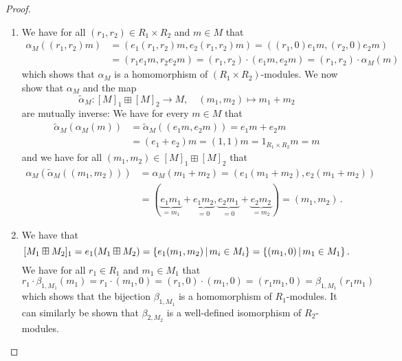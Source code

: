 \begin{proof}
  \leavevmode
  \begin{enumerate}
    \item
      We have for all $(r_1, r_2) \in R_1 \times R_2$ and $m \in M$ that
      \begin{align*}
            \alpha_M((r_1, r_2) m)
        &=  ( e_1 (r_1, r_2) m, e_2 (r_1, r_2) m )
         =  ( (r_1, 0) e_1 m, (r_2, 0) e_2 m )  \\
        &=  ( r_1 e_1 m , r_2 e_2 m )
         =  (r_1, r_2) \cdot (e_1 m, e_2 m)
         =  (r_1, r_2) \cdot \alpha_M(m)
      \end{align*}
      which shows that $\alpha_M$ is a homomorphism of $(R_1 \times R_2)$-modules.
      We now show that $\alpha_M$ and the map
      \[
                \tilde{\alpha}_M
        \colon  [M]_1 \boxplus [M]_2
        \to     M,
        \quad   (m_1, m_2)
        \mapsto m_1 + m_2
      \]
      are mutually inverse:
      We have for every $m \in M$ that
      \begin{align*}
            \tilde{\alpha}_M( \alpha_M(m) )
        &=  \tilde{\alpha}_M( (e_1 m, e_2 m) )
         =  e_1 m + e_2 m \\
        &=  (e_1 + e_2) m
         =  (1,1) m
         =  1_{R_1 \times R_2} m
         =  m
      \end{align*}
      and we have for all $(m_1, m_2) \in [M]_1 \boxplus [M]_2$ that
      \begin{align*}
            \alpha_M( \tilde{\alpha}_M( (m_1, m_2) ) )
        &=  \alpha_M( m_1 + m_2 )
         =  (e_1 (m_1 + m_2), e_2 (m_1 + m_2))  \\
        &=  (
              \underbrace{e_1 m_1}_{= m_1} + \underbrace{e_1 m_2}_{= 0},
              \underbrace{e_2 m_1}_{= 0} + \underbrace{e_2 m_2}_{= m_2}
            )
         =  (m_1, m_2) \,.
      \end{align*}
    \item
      We have that
      \[
          [M_1 \boxplus M_2]_1
        = e_1 (M_1 \boxplus M_2)
        = \{
            e_1 (m_1, m_2)
          \suchthat
            m_i \in M_i
          \}
        = \{
            (m_1, 0)
          \suchthat
            m_1 \in M_1
          \} \,.
      \]
      We have for all $r_1 \in R_1$ and $m_1 \in M_1$ that
      \[
          r_1 \cdot \beta_{1, M_1}(m_1)
        = r_1 \cdot (m_1, 0)
        = (r_1, 0) \cdot (m_1, 0)
        = (r_1 m_1, 0)
        = \beta_{1, M_1}(r_1 m_1)
      \]
      which shows that the bijection $\beta_{1,M_1}$ is a homomorphism of $R_1$-modules.
      It can similarly be shown that $\beta_{2,M_2}$ is a well-defined isomorphism of $R_2$-modules.
    \qedhere
  \end{enumerate}
\end{proof}


